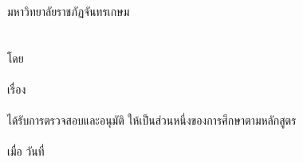 \cleardoublepage
\newpage


	{\centering  มหาวิทยาลัยราชภัฏจันทรเกษม\\
	\expandafter\uppercase\expandafter{\@facultyThai}\\[7mm]
	\expandafter\uppercase\expandafter{\@typeofwritingThai}\\[7mm]
	โดย\\[7mm]
	\expandafter\uppercase\expandafter{\@authorThai}\\[7mm]
	เรื่อง\\[7mm]
	\expandafter\uppercase\expandafter{\@thesistitleThai}\\[7mm]
	ได้รับการตรวจสอบและอนุมัติ ให้เป็นส่วนหนึ่งของการศึกษาตามหลักสูตร\\
	\@degreeThai\\[7mm]
	เมื่อ วันที่ \@approvaldate\\[7mm]}
	\vfill
	 \hfill 
	\parbox[t]{0.51\linewidth}{\centering\hrulefill\\\vspace{-2mm}\makebox[\linewidth][c]{(\@chairman)}}\\
	\vfill
	 \hfill 
	\parbox[t]{0.51\linewidth}{\centering\hrulefill\\\vspace{-2mm}\makebox[\linewidth][c]{(\@advisorThai)}}\\
	\ifdefined\@coadvisorThai\vfill
	 \hfill 
	\parbox[t]{0.51\linewidth}{\centering\hrulefill\\\vspace{-2mm}\makebox[\linewidth][c]{(\@coadvisorThai)}}\\\fi
	\ifdefined\@memberone\vfill
	 \hfill 
	\parbox[t]{0.51\linewidth}{\centering\hrulefill\\\vspace{-2mm}\makebox[\linewidth][c]{(\@memberone)}}\\\fi
	\ifdefined\@membertwo\vfill
	 \hfill 
	\parbox[t]{0.51\linewidth}{\centering\hrulefill\\\vspace{-2mm}\makebox[\linewidth][c]{(\@membertwo)}}\\\fi
	\vfill
	 \hfill 
	\parbox[t]{0.51\linewidth}{\centering\hrulefill\\\vspace{-2mm}\makebox[\linewidth][c]{(\@dean)}}
	\ifx\@coadvisorThai\undefined
	\\[5mm]
	\fi
	\ifx\@memberone\undefined
	\\[5mm]
	\fi
	\ifx\@membertwo\undefined
	\\[5mm]
	\fi
	
